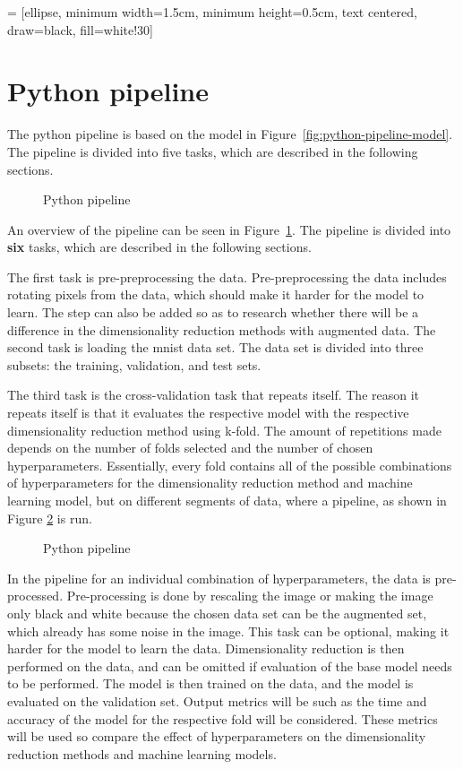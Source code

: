 = [ellipse, minimum width=1.5cm, minimum height=0.5cm, text centered, draw=black, fill=white!30]
\section{Python pipeline}\label{sec:python-pipeline}
The python pipeline is based on the model in Figure~\ref{fig:python-pipeline-model}. The pipeline is divided into five tasks, which are described in the following sections. 

\begin{figure}[htb!]
    \centering
    
    \caption{Python pipeline}
    \label{fig:Python-pipeline}
\end{figure}

An overview of the pipeline can be seen in Figure~\ref{fig:Python-pipeline}. The pipeline is divided into \textbf{six} tasks, which are described in the following sections. 

The first task is pre-preprocessing the data.  Pre-preprocessing the data includes rotating pixels from the data, which should make it harder for the model to learn. The step can also be added so as to research whether there will be a difference in the dimensionality reduction methods with augmented data. The second task is loading the \gls{mnist} data set. The data set is divided into three subsets: the training, validation, and test sets.


The third task is the cross-validation task that repeats itself. The reason it repeats itself is that it evaluates the respective model with the respective dimensionality reduction method using k-fold. The amount of repetitions made depends on the number of folds selected and the number of chosen hyperparameters. Essentially, every fold contains all of the possible combinations of hyperparameters for the dimensionality reduction method and machine learning model, but on different segments of data, where a pipeline, as shown in Figure \ref{fig:python-individual-pipeline} is run.

\begin{figure}[htb!]
    \centering
    
    \caption{Python pipeline}
    \label{fig:python-individual-pipeline}
\end{figure}

In the pipeline for an individual combination of hyperparameters, the data is pre-processed. Pre-processing is done by rescaling the image or making the image only black and white because the chosen data set can be the augmented set, which already has some noise in the image. This task can be optional, making it harder for the model to learn the data. Dimensionality reduction is then performed on the data, and can be omitted if evaluation of the base model needs to be performed. The model is then trained on the data, and the model is evaluated on the validation set. Output metrics will be such as the time and accuracy of the model for the respective fold will be considered. These metrics will be used so compare the effect of hyperparameters on the dimensionality reduction methods and machine learning models.


